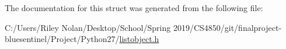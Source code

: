 The documentation for this struct was generated from the following file\+:\begin{DoxyCompactItemize}
\item 
C\+:/\+Users/\+Riley Nolan/\+Desktop/\+School/\+Spring 2019/\+C\+S4850/git/finalproject-\/bluesentinel/\+Project/\+Python27/\mbox{\hyperlink{listobject_8h}{listobject.\+h}}\end{DoxyCompactItemize}
